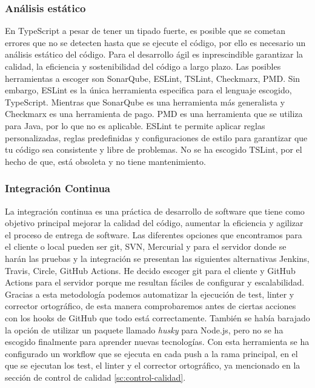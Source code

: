 \subsubsection*{Análisis estático}
En TypeScript a pesar de tener un tipado fuerte, es posible que se cometan errores que no se detecten hasta que se ejecute el código, por ello es necesario un análisis estático del código.
Para el desarrollo ágil es inprescindible garantizar la calidad, la eficiencia y sostenibilidad del código a largo plazo.
Las posibles herramientas a escoger son SonarQube, ESLint, TSLint, Checkmarx, PMD. Sin embargo, ESLint es la única herramienta especifica para el lenguaje escogido, TypeScript.
Mientras que SonarQube es una herramienta más generalista y Checkmarx es una herramienta de pago. PMD es una herramienta que se utiliza para Java, por lo que no es aplicable.
ESLint te permite aplicar reglas personalizadas, reglas predefinidas y configuraciones de estilo para garantizar que tu código sea consistente y libre de problemas.
No se ha escogido TSLint, por el hecho de que, está obsoleta y no tiene mantenimiento.

\subsubsection*{Integración Continua}
La integración continua es una práctica de desarrollo de software que tiene como objetivo principal mejorar la calidad del código, aumentar la eficiencia y agilizar el proceso de entrega de software.
Las diferentes opciones que encontramos para el cliente o local pueden ser git, SVN, Mercurial y para el servidor donde se harán las pruebas y la integración se presentan las siguientes
alternativas Jenkins, Travis, Circle, GitHub Actions. He decido escoger git para el cliente y GitHub Actions para el servidor porque me resultan fáciles de configurar y escalabilidad.
Gracias a esta metodología podemos automatizar la ejecución de test, linter y corrector ortográfico, de esta manera comprobaremos antes de ciertas acciones con los hooks de GitHub que todo está
correctamente. También se había barajado la opción de utilizar un paquete llamado \textit{husky} para Node.js, pero no se ha escogido finalmente para aprender nuevas tecnologías.
Con esta herramienta se ha configurado un workflow que se ejecuta en cada push a la rama principal, en el que se ejecutan los test, el linter y el corrector ortográfico, ya mencionado en la sección de control de calidad \ref{sc:control-calidad}.
